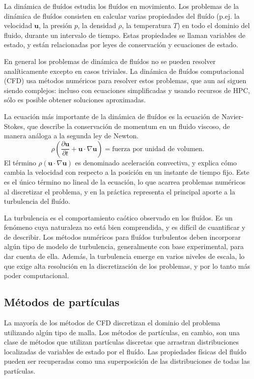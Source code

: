 \documentclass[11pt,spanish]{article}
\newcommand{\vel}{\mathbf{u}}
\begin{document}
La dinámica de fluídos estudia los fluídos en movimiento.  Los problemas de la
dinámica de fluídos consisten en calcular varias propiedades del fluído (p.ej.
la velocidad $\vel$, la presión $p$, la densidad $\rho$, la temperatura $T$) en
todo el dominio del fluido, durante un intervalo de tiempo.  Estas propiedades
se llaman variables de estado, y están relacionadas por leyes de conservación y
ecuaciones de estado.

En general los problemas de dinámica de fluídos no se pueden resolver
analíticamente excepto en casos triviales.  La dinámica de fluídos computacional
(CFD) usa métodos numéricos para resolver estos problemas, que aun así siguen
siendo complejos:  incluso con ecuaciones simplificadas y usando recursos de
HPC, sólo es posible obtener soluciones aproximadas.

La ecuación más importante de la dinámica de fluídos es la ecuación de
Navier-Stokes, que describe la conservación de momentum en un fluido viscoso,
de manera análoga a la segunda ley de Newton.  
\begin{equation}
    \rho\left(\frac{\partial\vel}{\partial t} + \vel\cdot\nabla\vel \right) =
    \text{fuerza por unidad de volumen}.
\end{equation}
El término $\rho(\vel\cdot\nabla\vel)$ es denominado aceleración convectiva, y
explica cómo cambia la velocidad con respecto a la posición en un instante de
tiempo fijo.  Este es el único término no lineal de la ecuación, lo que acarrea
problemas numéricos al discretizar el problema, y en la práctica representa el
principal aporte a la turbulencia del fluído.

La turbulencia es el comportamiento caótico observado en los fluídos.  Es un
fenómeno cuya naturaleza no está bien comprendida, y es difícil de cuantificar y
de describir.  Los métodos numéricos para fluídos turbulentos deben incorporar
algún tipo de modelo de turbulencia, generalmente con base experimental, para
dar cuenta de ella.  Además, la turbulencia emerge en varios niveles de escala,
lo que exige alta resolución en la discretización de los problemas, y por lo
tanto más poder computacional.

\subsection{Métodos de partículas}
La mayoría de los métodos de CFD discretizan el dominio del problema utilizando
algún tipo de malla.  Los métodos de partículas, en cambio, son una clase
de métodos que utilizan partículas discretas que arrastran distribuciones
localizadas de variables de estado por el fluído.  Las propiedades físicas del
fluído pueden ser recuperadas como una superposición de las distribuciones
de todas las partículas.
\end{document}
